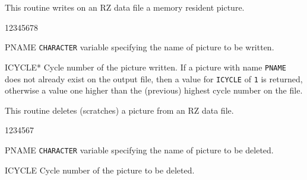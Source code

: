 \Action
This routine writes on an RZ data file a memory resident picture.
\Pdesc
\begin{DLtt}{12345678}
\item[PNAME] {\tt CHARACTER} variable specifying the name of picture to be
             written.
\item[ICYCLE*] Cycle number of the picture written. If a picture with name 
               {\tt PNAME} does not already exist on the output file, then a 
               value for {\tt ICYCLE} of {\tt 1} is returned, otherwise a value
               one higher than the (previous) highest cycle number on the file.
\end{DLtt}


\Action
This routine deletes (scratches) a picture from an RZ data file.
\Pdesc
\begin{DLtt}{1234567}
\item[PNAME] {\tt CHARACTER} variable specifying the name of
picture to be deleted.
\item[ICYCLE] Cycle number of the picture to be deleted.
\end{DLtt}
